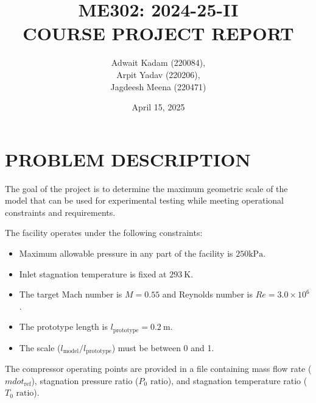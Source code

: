 \documentclass[12pt,a4paper]{article}
\title{ME302: 2024-25-II \\ COURSE PROJECT REPORT}
\author{Adwait Kadam (220084),\\Arpit Yadav (220206),\\Jagdeesh Meena (220471)}
\date{April 15, 2025}
\begin{document}
	
	\maketitle
	\newpage
	\section*{PROBLEM DESCRIPTION}
	The goal of the project is to determine the maximum geometric scale of the model that can be used for experimental testing while meeting operational constraints and requirements.
	
	The facility operates under the following constraints:
	\begin{itemize}
		\item Maximum allowable pressure in any part of the facility is \(250 \mathrm{kPa}\).
		\item Inlet stagnation temperature is fixed at \(293 \mathrm{~K}\).
		\item The target Mach number is \(M = 0.55\) and Reynolds number is \(Re = 3.0 \times 10^6\).
		\item The prototype length is \(l_{\text{prototype}} = 0.2 \mathrm{~m}\).
		\item The scale (\(l_{\text{model}} / l_{\text{prototype}}\)) must be between 0 and 1.
	\end{itemize}
	
	The compressor operating points are provided in a file containing mass flow rate (\(mdot_{\text{ref}}\)), stagnation pressure ratio (\(P_0 \text{ ratio}\)), and stagnation temperature ratio (\(T_0 \text{ ratio}\)).
		
\end{document}
